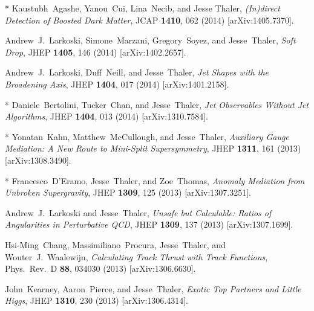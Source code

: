 \documentclass[11pt]{article}
\renewcommand{\bibitem}[1]{\item}
\begin{document}
\begin{list}{[]\addtocounter{jessecount}{-1}}{\leftmargin=3em \itemsep=4pt}
\bibitem{Agashe:2014yua} 
  * Kaustubh~Agashe, Yanou~Cui, Lina~Necib, and Jesse Thaler, 
  \emph{(In)direct Detection of Boosted Dark Matter},
  JCAP {\bf 1410}, 062 (2014)
  [arXiv:1405.7370].


\bibitem{Larkoski:2014wba} 
  Andrew~J.~Larkoski, Simone~Marzani, Gregory~Soyez, and Jesse~Thaler, 
  \emph{Soft Drop},
JHEP {\bf 1405}, 146 (2014)
  [arXiv:1402.2657].

\bibitem{Larkoski:2014uqa} 
  Andrew~J.~Larkoski, Duff~Neill, and Jesse~Thaler,
  \emph{Jet Shapes with the Broadening Axis},
  JHEP {\bf 1404}, 017 (2014)
  [arXiv:1401.2158].

\bibitem{Bertolini:2013iqa} 
  * Daniele~Bertolini, Tucker~Chan, and Jesse~Thaler,
  \emph{Jet Observables Without Jet Algorithms},
  JHEP {\bf 1404}, 013 (2014)
  [arXiv:1310.7584].

\bibitem{Kahn:2013pfa} 
  * Yonatan~Kahn, Matthew~McCullough, and Jesse~Thaler,
  \emph{Auxiliary Gauge Mediation: A New Route to Mini-Split Supersymmetry},
  JHEP {\bf 1311}, 161 (2013)
  [arXiv:1308.3490].

\bibitem{D'Eramo:2013mya} 
  * Francesco~D'Eramo, Jesse~Thaler, and Zoe~Thomas,
  \emph{Anomaly Mediation from Unbroken Supergravity},
  JHEP {\bf 1309}, 125 (2013)
  [arXiv:1307.3251].

\bibitem{Larkoski:2013paa} 
  Andrew~J.~Larkoski and Jesse~Thaler,
  \emph{Unsafe but Calculable: Ratios of Angularities in Perturbative QCD},
  JHEP {\bf 1309}, 137 (2013)
  [arXiv:1307.1699].
  
\bibitem{Chang:2013iba} 
  Hsi-Ming~Chang, Massimiliano~Procura, Jesse~Thaler, and Wouter~J.~Waalewijn,
  \emph{Calculating Track Thrust with Track Functions},
  Phys.\ Rev.\ D {\bf 88}, 034030 (2013)
  [arXiv:1306.6630].

\bibitem{Kearney:2013cca} 
  John~Kearney, Aaron~Pierce, and Jesse~Thaler,
  \emph{Exotic Top Partners and Little Higgs},
  JHEP {\bf 1310}, 230 (2013)
  [arXiv:1306.4314].


\end{list}
\end{document}
